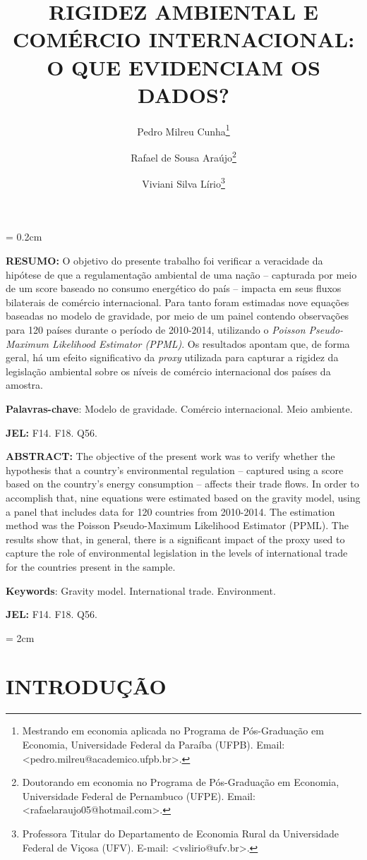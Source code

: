 \documentclass[12pt,
               openright,
               oneside,
               a4paper,
							 section=TITLE,     %
               subsection=Title,  %
               english,brazil]{article}
\title{RIGIDEZ AMBIENTAL E COMÉRCIO INTERNACIONAL: O QUE EVIDENCIAM OS DADOS?}
\author{Pedro Milreu Cunha\thanks{Mestrando em economia aplicada no Programa de Pós-Graduação em Economia, Universidade Federal da Paraíba (UFPB). Email: <pedro.milreu@academico.ufpb.br>.} \and Rafael de Sousa Araújo\thanks{Doutorando em economia no Programa de Pós-Graduação em Economia, Universidade Federal de Pernambuco (UFPE). Email: <rafaelaraujo05@hotmail.com>.} \and Viviani Silva Lírio\thanks{Professora Titular do Departamento de Economia Rural da Universidade Federal de Viçosa (UFV). E-mail: <vslirio@ufv.br>.}}
\date{}
\begin{document}
\topmargin = 0.2cm
\maketitle

\setlength{\parindent}{0cm}

\textbf{RESUMO:} O objetivo do presente trabalho foi verificar a veracidade da hipótese de que a regulamentação ambiental de uma nação – capturada por meio de um score baseado no consumo energético do país – impacta em seus fluxos bilaterais de comércio internacional. Para tanto foram estimadas nove equações baseadas no modelo de gravidade, por meio de um painel contendo observações para 120 países durante o período de 2010-2014, utilizando o \textit{Poisson Pseudo-Maximum Likelihood Estimator (PPML)}. Os resultados apontam que, de forma geral, há um efeito significativo da \textit{proxy} utilizada para capturar a rigidez da legislação ambiental sobre os níveis de comércio internacional dos países da amostra.


\textbf{Palavras-chave}:  Modelo de gravidade. Comércio internacional. Meio ambiente.

\textbf{JEL:} F14. F18. Q56. 

\vspace{0.6cm}

\textbf{ABSTRACT:} The objective of the present work was to verify whether the hypothesis that a country’s environmental regulation – captured using a score based on the country’s energy consumption – affects their trade flows. In order to accomplish that, nine equations were estimated based on the gravity model, using a panel that includes data for 120 countries from 2010-2014. The estimation method was the Poisson Pseudo-Maximum Likelihood Estimator (PPML). The results show that, in general, there is a significant impact of the proxy used to capture the role of environmental legislation in the levels of international trade for the countries present in the sample.

\textbf{Keywords}: Gravity model. International trade. Environment.

\textbf{JEL:} F14. F18. Q56. 


\topmargin = 2cm
\setlength{\parindent}{1.5cm}

\maketitle

\section{\textbf{INTRODUÇÃO}}
\end{document}
